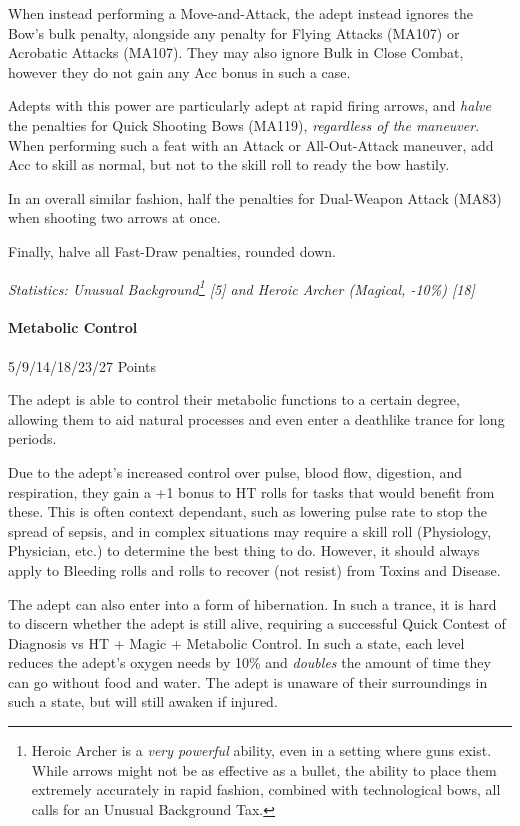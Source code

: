 \begin{multicols}{3}
		When instead performing a Move-and-Attack, the adept instead ignores the Bow's bulk penalty, alongside any penalty for Flying Attacks (MA107) or Acrobatic Attacks (MA107). They may also ignore Bulk in Close Combat, however they do not gain any Acc bonus in such a case.
		
		Adepts with this power are particularly adept at rapid firing arrows, and \textit{halve} the penalties for Quick Shooting Bows (MA119), \textit{regardless of the maneuver}. When performing such a feat with an Attack or All-Out-Attack maneuver, add Acc to skill as normal, but not to the skill roll to ready the bow hastily. 
		
		In an overall similar fashion, half the penalties for Dual-Weapon Attack (MA83) when shooting two arrows at once.
		
		Finally, halve all Fast-Draw penalties, rounded down.

		\textcolor{OliveGreen}{\textit{Statistics: Unusual Background\footnote{Heroic Archer is a \textit{very powerful} ability, even in a setting where guns exist. While arrows might not be as effective as a bullet, the ability to place them extremely accurately in rapid fashion, combined with technological bows, all calls for an Unusual Background Tax.} [5] and Heroic Archer (Magical, -10\%) [18] }}
	
	\paragraph{Metabolic Control}
	\begin{flushright}
		5/9/14/18/23/27 Points
	\end{flushright}

		The adept is able to control their metabolic functions to a certain degree, allowing them to aid natural processes and even enter a deathlike trance for long periods.
		
		Due to the adept's increased control over pulse, blood flow, digestion, and respiration, they gain a +1 bonus to HT rolls for tasks that would benefit from these. This is often context dependant, such as lowering pulse rate to stop the spread of sepsis, and in complex situations may require a skill roll (Physiology, Physician, etc.) to determine the best thing to do. However, it should always apply to Bleeding rolls and rolls to recover (not resist) from Toxins and Disease.
		
		The adept can also enter into a form of hibernation. In such a trance, it is hard to discern whether the adept is still alive, requiring a successful Quick Contest of Diagnosis vs HT + Magic + Metabolic Control. In such a state, each level reduces the adept's oxygen needs by 10\% and \textit{doubles} the amount of time they can go without food and water.	The adept is unaware of their surroundings in such a state, but will still awaken if injured. 


\end{multicols}
